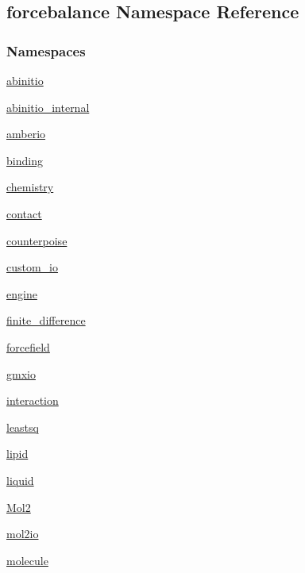 \hypertarget{namespaceforcebalance}{\subsection{forcebalance Namespace Reference}
\label{namespaceforcebalance}
}
\subsubsection*{Namespaces}
\begin{DoxyCompactItemize}
\item 
\hyperlink{namespaceforcebalance_1_1abinitio}{abinitio}
\item 
\hyperlink{namespaceforcebalance_1_1abinitio__internal}{abinitio\-\_\-internal}
\item 
\hyperlink{namespaceforcebalance_1_1amberio}{amberio}
\item 
\hyperlink{namespaceforcebalance_1_1binding}{binding}
\item 
\hyperlink{namespaceforcebalance_1_1chemistry}{chemistry}
\item 
\hyperlink{namespaceforcebalance_1_1contact}{contact}
\item 
\hyperlink{namespaceforcebalance_1_1counterpoise}{counterpoise}
\item 
\hyperlink{namespaceforcebalance_1_1custom__io}{custom\-\_\-io}
\item 
\hyperlink{namespaceforcebalance_1_1engine}{engine}
\item 
\hyperlink{namespaceforcebalance_1_1finite__difference}{finite\-\_\-difference}
\item 
\hyperlink{namespaceforcebalance_1_1forcefield}{forcefield}
\item 
\hyperlink{namespaceforcebalance_1_1gmxio}{gmxio}
\item 
\hyperlink{namespaceforcebalance_1_1interaction}{interaction}
\item 
\hyperlink{namespaceforcebalance_1_1leastsq}{leastsq}
\item 
\hyperlink{namespaceforcebalance_1_1lipid}{lipid}
\item 
\hyperlink{namespaceforcebalance_1_1liquid}{liquid}
\item 
\hyperlink{namespaceforcebalance_1_1Mol2}{Mol2}
\item 
\hyperlink{namespaceforcebalance_1_1mol2io}{mol2io}
\item 
\hyperlink{namespaceforcebalance_1_1molecule}{molecule}
\item 

\end{DoxyCompactItemize}
